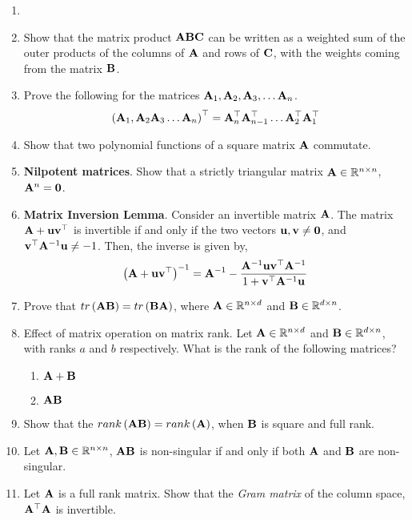 \documentclass[
11pt, %
a4paper, %
oneside, %
headinclude,footinclude, %
BCOR5mm, %
]{scrartcl}
\def\mf{\ensuremath\mathbf}
\def\mb{\ensuremath\mathbb}
\def\lp{\ensuremath\left(}
\def\rp{\ensuremath\right)}
\begin{document}
\begin{enumerate}

\item 

\item Show that the matrix product $\mf{A}\mf{B}\mf{C}$ can be written as a weighted sum  of the outer products of the columns of $\mf{A}$ and rows of $\mf{C}$, with the weights coming from the matrix $\mf{B}$.

\item Prove the following for the matrices $\mf{A}_1, \mf{A}_2, \mf{A}_3, \ldots \mf{A}_n$.
\[ \lp \mf{A}_1, \mf{A}_2 \mf{A}_3 \ldots \mf{A}_n \rp^\top =  \mf{A}_n^\top \mf{A}_{n-1}^\top \ldots \mf{A}_2^\top \mf{A}_1^\top \]


\item Show that two polynomial functions of a square matrix $\mf{A}$ commutate.

\item \textbf{Nilpotent matrices}. Show that a strictly triangular matrix $\mf{A} \in \mb{R}^{n \times n}$, $\mf{A}^n = \mf{0}$.

\item \textbf{Matrix Inversion Lemma}. Consider an invertible matrix $\mf{A}$. The matrix $\mf{A} + \mf{u}\mf{v}^\top$ is invertible if and only if the two vectors $\mf{u}, \mf{v} \neq \mf{0}$, and $\mf{v}^\top\mf{A}^{-1}\mf{u} \neq -1$. Then, the inverse is given by,
\[ \lp \mf{A} + \mf{u}\mf{v}^\top\rp^{-1} = \mf{A}^{-1} - \frac{\mf{A}^{-1}\mf{u}\mf{v}^\top\mf{A}^{-1}}{1 + \mf{v}^{\top}\mf{A}^{-1}\mf{u}} \]

\item Prove that $tr\lp \mf{A}\mf{B} \rp = tr\lp \mf{B}\mf{A} \rp$, where $\mf{A} \in \mb{R}^{n \times d}$ and $\mf{B} \in \mb{R}^{d \times n}$.

\item Effect of matrix operation on matrix rank. Let $\mf{A} \in \mb{R}^{n \times d}$ and $\mf{B} \in \mb{R}^{d \times n}$, with ranks $a$ and $b$ respectively. What is the rank of the following matrices?
	\begin{enumerate}
		\item $\mf{A} + \mf{B}$
		\item $\mf{A}\mf{B}$
	\end{enumerate}

\item Show that the $rank\pp{\mf{A}\mf{B}} = rank\pp{\mf{A}}$, when $\mf{B}$ is square and full rank.

\item Let $\mf{A}, \mf{B} \in \mb{R}^{n \times n}$, $\mf{A}\mf{B}$ is non-singular if and only if both $\mf{A}$ and $\mf{B}$ are non-singular.

\item Let $\mf{A}$ is a full rank matrix. Show that the \textit{Gram matrix} of the column space, $\mf{A}^\top\mf{A}$ is invertible.

\end{enumerate}
\end{document}
